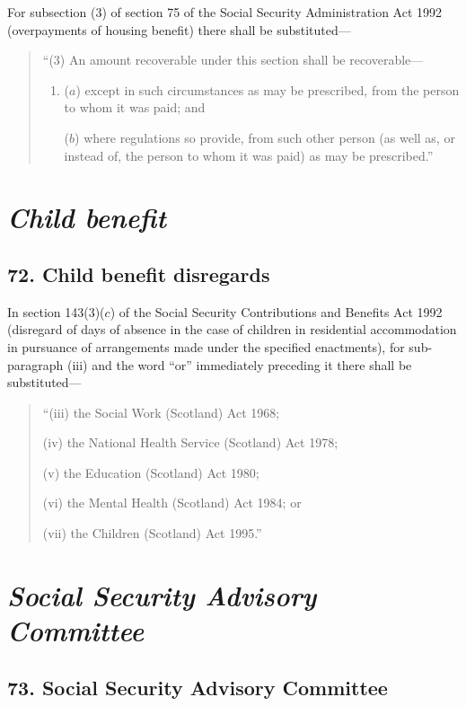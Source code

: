 \documentclass[12pt,a4paper]{article}
\begin{document}
For subsection (3)  of section 75 of the Social Security Administration Act 1992 (overpayments of housing benefit) there shall be substituted—
\begin{quotation}
“(3) An amount recoverable under this section shall be recoverable—
\begin{enumerate}\item[]
($a$) except in such circumstances as may be prescribed, from the person to whom it was paid; and

($b$) where regulations so provide, from such other person (as well as, or instead of, the person to whom it was paid) as may be prescribed.”
\end{enumerate}
\end{quotation}

\section{\itshape Child benefit}

\subsection{72. Child benefit disregards}

In section 143(3)($c$)  of the Social Security Contributions and Benefits Act 1992 (disregard of days of absence in the case of children in residential accommodation in pursuance of arrangements made under the specified enactments), for sub-paragraph (iii)  and the word “or” immediately preceding it there shall be substituted—
\begin{quotation}
“(iii) the Social Work (Scotland) Act 1968;

(iv) the National Health Service (Scotland) Act 1978;

(v) the Education (Scotland) Act 1980;

(vi) the Mental Health (Scotland) Act 1984; or

(vii) the Children (Scotland) Act 1995.”
\end{quotation}

\section{\itshape Social Security Advisory Committee}

\subsection{73. Social Security Advisory Committee}
\end{document}
